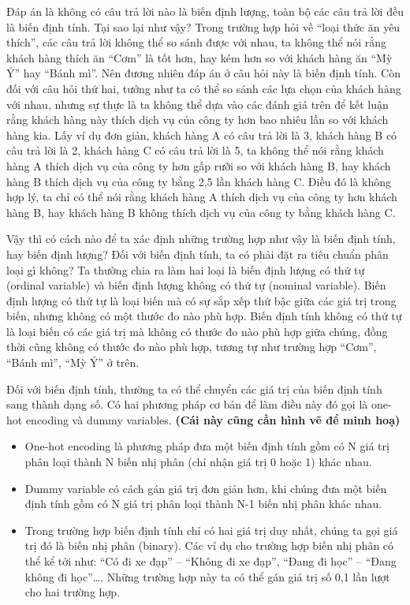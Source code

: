 \documentclass[
  12pt,
]{krantz}
\providecommand{\tightlist}{%
  \setlength{\itemsep}{0pt}\setlength{\parskip}{0pt}}
\begin{document}
Đáp án là không có câu trả lời nào là biến định lượng, toàn bộ các câu trả lời đều là biến định tính. Tại sao lại như vậy? Trong trường hợp hỏi về ``loại thức ăn yêu thích'', các câu trả lời không thể so sánh được với nhau, ta không thể nói rằng khách hàng thích ăn ``Cơm'' là tốt hơn, hay kém hơn so với khách hàng ăn ``Mỳ Ý'' hay ``Bánh mì''. Nên đương nhiên đáp án ở câu hỏi này là biến định tính. Còn đối với câu hỏi thứ hai, tưởng như ta có thể so sánh các lựa chọn của khách hàng với nhau, nhưng sự thực là ta không thể dựa vào các đánh giá trên để kết luận rằng khách hàng này thích dịch vụ của công ty hơn bao nhiêu lần so với khách hàng kia. Lấy ví dụ đơn giản, khách hàng A có câu trả lời là 3, khách hàng B có câu trả lời là 2, khách hàng C có câu trả lời là 5, ta không thể nói rằng khách hàng A thích dịch vụ của công ty hơn gấp rưỡi so với khách hàng B, hay khách hàng B thích dịch vụ của công ty bằng 2,5 lần khách hàng C. Điều đó là không hợp lý, ta chỉ có thể nói rằng khách hàng A thích dịch vụ của công ty hơn khách hàng B, hay khách hàng B không thích dịch vụ của công ty bằng khách hàng C.

Vậy thì có cách nào để ta xác định những trường hợp như vậy là biến định tính, hay biến định lượng? Đối với biến định tính, ta có phải đặt ra tiêu chuẩn phân loại gì không? Ta thường chia ra làm hai loại là biến định lượng có thứ tự (ordinal variable) và biến định lượng không có thứ tự (nominal variable). Biến định lượng có thứ tự là loại biến mà có sự sắp xếp thứ bậc giữa các giá trị trong biến, nhưng không có một thước đo nào phù hợp. Biến định tính không có thứ tự là loại biến có các giá trị mà không có thước đo nào phù hợp giữa chúng, đồng thời cũng không có thước đo nào phù hợp, tương tự như trường hợp ``Cơm'', ``Bánh mì'', ``Mỳ Ý'' ở trên.

Đối với biến định tính, thường ta có thể chuyển các giá trị của biến định tính sang thành dạng số. Có hai phương pháp cơ bản để làm điều này đó gọi là one-hot encoding và dummy variables. \textbf{(Cái này cũng cần hình vẽ để minh hoạ)}

\begin{itemize}
\tightlist
\item
  One-hot encoding là phương pháp đưa một biến định tính gồm có N giá trị phân loại thành N biến nhị phân (chỉ nhận giá trị 0 hoặc 1) khác nhau.
\item
  Dummy variable có cách gán giá trị đơn giản hơn, khi chúng đưa một biến định tính gồm có N giá trị phân loại thành N-1 biến nhị phân khác nhau.
\item
  Trong trường hợp biến định tính chỉ có hai giá trị duy nhất, chúng ta gọi giá trị đó là biến nhị phân (binary). Các ví dụ cho trường hợp biến nhị phân có thể kể tới như: ``Có đi xe đạp'' -- ``Không đi xe đạp'', ``Đang đi học'' -- ``Đang không đi học''\ldots. Những trường hợp này ta có thể gán giá trị số 0,1 lần lượt cho hai trường hợp.
\end{itemize}
\end{document}
